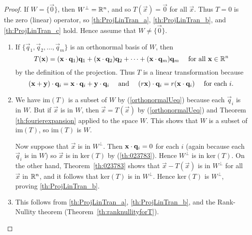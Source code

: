 \documentclass{ximera}
\begin{document}
\begin{proof}
If $W = \{\vec{0}\}$, then $W^\perp = \mathbb{R}^n$, and so $T(\vec{x}) = \vec{0}$ for all $\vec{x}$. Thus $T = 0$ is the zero (linear) operator, so \ref{th:ProjLinTran_a}, \ref{th:ProjLinTran_b}, and \ref{th:ProjLinTran_c} hold. Hence assume that $W \neq \{\vec{0}\}$.

\begin{enumerate}
\item If $\{\vec{q}_{1}, \vec{q}_{2}, \dots, \vec{q}_{m}\}$ is an orthonormal basis of $W$, then
\begin{equation}\label{orthonormalUeq}
T(\mathbf{x}) = (\mathbf{x} \cdot \mathbf{q}_{1})\mathbf{q}_{1} + (\mathbf{x} \cdot \mathbf{q}_{2})\mathbf{q}_{2} + \dots + (\mathbf{x} \cdot \mathbf{q}_{m})\mathbf{q}_{m} \quad \mbox{ for all }\mathbf{x}\in \mathbb{R}^n
\end{equation}
by the definition of the projection. Thus $T$ is a linear transformation because
\begin{equation*}
(\mathbf{x} + \mathbf{y}) \cdot \mathbf{q}_{i} = \mathbf{x} \cdot \mathbf{q}_{i} + \mathbf{y} \cdot \mathbf{q}_{i} \quad \mbox{ and } \quad (r\mathbf{x}) \cdot \mathbf{q}_{i} = r(\mathbf{x} \cdot \mathbf{q}_{i}) \quad \mbox{ for each } i.
\end{equation*}

\item %
We have $\mbox{im}(T)$ is a subset of $W$ by (\ref{orthonormalUeq}) because each $\vec{q}_{i}$ is in $W$. But if $\vec{x}$ is in $W$, then $\vec{x} = T(\vec{x})$ by (\ref{orthonormalUeq}) and Theorem \ref{th:fourierexpansion} applied to the space $W$. This shows that $W$ is a subset of $\mbox{im}(T)$, so $\mbox{im}(T)$ is $W$.

Now suppose that $\vec{x}$ is in $W^\perp$. Then $\mathbf{x} \cdot \mathbf{q}_{i} = 0$ for each $i$ (again because each $\vec{q}_{i}$ is in $W$) so $\vec{x}$ is in $\mbox{ker}(T)$ by (\ref{th:023783}). Hence $W^\perp$ is in $\mbox{ker}(T)$. On the other hand, Theorem~\ref{th:023783} shows that $\vec{x} - T(\vec{x})$ is in $W^\perp$ for all $\vec{x}$ in $\mathbb{R}^n$, and it follows that $\mbox{ker}(T)$ is in $W^\perp$. Hence $\mbox{ker}(T)$ is $W^\perp$, proving \ref{th:ProjLinTran_b}.

\item This follows from \ref{th:ProjLinTran_a}, \ref{th:ProjLinTran_b}, and the Rank-Nullity theorem (Theorem~\ref{th:ranknullityforT}).
\end{enumerate}
\end{proof}
\end{document}
